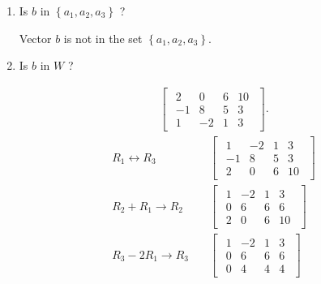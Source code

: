 \documentclass{zc-ust-hw}
\begin{document}
\begin{enumerate}
      \begin{enumerate}
        \item Is ${b}$ in $\left\{{a}_1, {a}_2, {a}_3\right\}$ ?

          Vector $b$ is not in the set $\left\{{a}_1, {a}_2, {a}_3\right\}$.

        \item Is ${b}$ in ${W}$ ?

          \begin{align}
            \begin{bmatrix} 
              \begin{array}{ccc|c}
                2 & 0 & 6 & 10 \\
                -1 & 8 & 5 & 3 \\
                1 & -2 & 1 & 3
              \end{array}
            \end{bmatrix}
          .\end{align}
          \begin{align}
            R_1\leftrightarrow R_3
            & \quad
            \begin{bmatrix} 
              \begin{array}{ccc|c}
                1 & -2 & 1 & 3 \\
                -1 & 8 & 5 & 3 \\
                2 & 0 & 6 & 10
              \end{array}
            \end{bmatrix} \\
            R_2+R_1\rightarrow R_2
            & \quad
            \begin{bmatrix} 
              \begin{array}{ccc|c}
                1 & -2 & 1 & 3 \\
                0 & 6 & 6 & 6 \\
                2 & 0 & 6 & 10
              \end{array}
            \end{bmatrix} \\
            R_3-2R_1\rightarrow R_3
            & \quad
            \begin{bmatrix} 
              \begin{array}{ccc|c}
                1 & -2 & 1 & 3 \\
                0 & 6 & 6 & 6 \\
                0 & 4 & 4 & 4
              \end{array}

\end{bmatrix}
\end{align}
\end{enumerate}
\end{enumerate}
\end{document}
